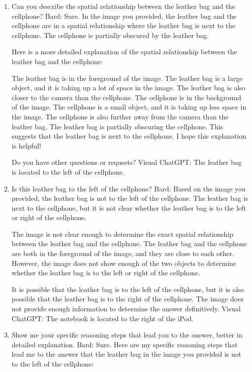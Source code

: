 \begin{enumerate}
    \item Can you describe the spatial relationship between the leather bag and the cellphone?
    \subitem Bard: 
    Sure. In the image you provided, the leather bag and the cellphone are in a spatial relationship where the leather bag is next to the cellphone. The cellphone is partially obscured by the leather bag.
    
    Here is a more detailed explanation of the spatial relationship between the leather bag and the cellphone:
    
    The leather bag is in the foreground of the image. The leather bag is a large object, and it is taking up a lot of space in the image. The leather bag is also closer to the camera than the cellphone.
    The cellphone is in the background of the image. The cellphone is a small object, and it is taking up less space in the image. The cellphone is also further away from the camera than the leather bag.
    The leather bag is partially obscuring the cellphone. This suggests that the leather bag is next to the cellphone.
    I hope this explanation is helpful!
    
    Do you have other questions or requests?
    \subitem Visual ChatGPT: The leather bag is located to the left of the cellphone.
    \item Is this leather bag to the left of the cellphone?
    \subitem Bard:
    Based on the image you provided, the leather bag is not to the left of the cellphone. The leather bag is next to the cellphone, but it is not clear whether the leather bag is to the left or right of the cellphone.

    The image is not clear enough to determine the exact spatial relationship between the leather bag and the cellphone. The leather bag and the cellphone are both in the foreground of the image, and they are close to each other. However, the image does not show enough of the two objects to determine whether the leather bag is to the left or right of the cellphone.

    It is possible that the leather bag is to the left of the cellphone, but it is also possible that the leather bag is to the right of the cellphone. The image does not provide enough information to determine the answer definitively.
    \subitem Visual ChatGPT: The notebook is located to the right of the iPod.
    \item Show me your specific reasoning steps that lead you to the answer, better in detailed explanation.
    \subitem Bard: Sure. Here are my specific reasoning steps that lead me to the answer that the leather bag in the image you provided is not to the left of the cellphone:


\end{enumerate}
